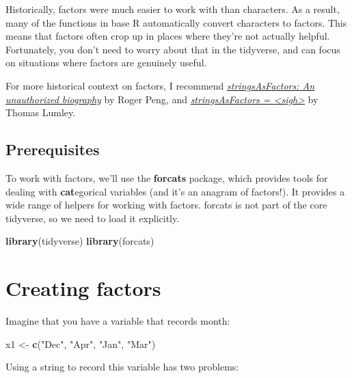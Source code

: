 \documentclass[]{book}
\newenvironment{Shaded}{\begin{snugshade}}{\end{snugshade}}
\newcommand{\KeywordTok}[1]{\textcolor[rgb]{0.13,0.29,0.53}{\textbf{{#1}}}}
\newcommand{\StringTok}[1]{\textcolor[rgb]{0.31,0.60,0.02}{{#1}}}
\newcommand{\NormalTok}[1]{{#1}}
\begin{document}
Historically, factors were much easier to work with than characters. As
a result, many of the functions in base R automatically convert
characters to factors. This means that factors often crop up in places
where they're not actually helpful. Fortunately, you don't need to worry
about that in the tidyverse, and can focus on situations where factors
are genuinely useful.

For more historical context on factors, I recommend
\href{http://simplystatistics.org/2015/07/24/stringsasfactors-an-unauthorized-biography/}{\emph{stringsAsFactors:
An unauthorized biography}} by Roger Peng, and
\href{http://notstatschat.tumblr.com/post/124987394001/stringsasfactors-sigh}{\emph{stringsAsFactors
= \textless{}sigh\textgreater{}}} by Thomas Lumley.

\subsection{Prerequisites}\label{prerequisites-9}

To work with factors, we'll use the \textbf{forcats} package, which
provides tools for dealing with \textbf{cat}egorical variables (and it's
an anagram of factors!). It provides a wide range of helpers for working
with factors. forcats is not part of the core tidyverse, so we need to
load it explicitly.

\begin{Shaded}
\begin{Highlighting}[]
\KeywordTok{library}\NormalTok{(tidyverse)}
\KeywordTok{library}\NormalTok{(forcats)}
\end{Highlighting}
\end{Shaded}

\section{Creating factors}\label{creating-factors}

Imagine that you have a variable that records month:

\begin{Shaded}
\begin{Highlighting}[]
\NormalTok{x1 <-}\StringTok{ }\KeywordTok{c}\NormalTok{(}\StringTok{"Dec"}\NormalTok{, }\StringTok{"Apr"}\NormalTok{, }\StringTok{"Jan"}\NormalTok{, }\StringTok{"Mar"}\NormalTok{)}
\end{Highlighting}
\end{Shaded}

Using a string to record this variable has two problems:
\end{document}
